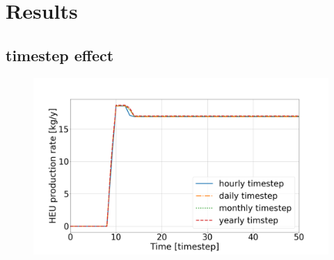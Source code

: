 \section{Results}
\subsection{timestep effect}
\begin{figure}[ht] %
    \centering
    \includegraphics[scale=0.18]{HEU_prod_timestep}
    \caption{}
    \label{fig:HEU_timestep}
\end{figure}


